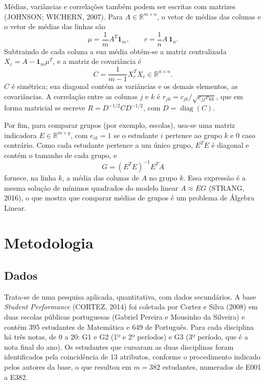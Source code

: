 \documentclass[12pt,a4paper]{article}
\newcommand{\R}{\mathbb{R}}
\begin{document}
Médias, variâncias e correlações também podem ser escritas com matrizes (JOHNSON; WICHERN, 2007). Para $A\in\R^{m\times n}$, o vetor de médias das colunas e o vetor de médias das linhas são
\begin{equation}
\mu=\frac{1}{m}A^T\mathbf{1}_m, \qquad r=\frac{1}{n}A\,\mathbf{1}_n .
\label{eq:medias}
\end{equation}
Subtraindo de cada coluna a sua média obtém-se a matriz centralizada $X_c=A-\mathbf{1}_m\mu^T$, e a matriz de covariância é
\begin{equation}
C=\frac{1}{m-1}X_c^T X_c \in \R^{n\times n}.
\label{eq:cov}
\end{equation}
$C$ é simétrica; sua diagonal contém as variâncias e os demais elementos, as covariâncias. A correlação entre as colunas $j$ e $k$ é $r_{jk}=c_{jk}/\sqrt{c_{jj}c_{kk}}$, que em forma matricial se escreve $R=D^{-1/2}CD^{-1/2}$, com $D=\operatorname{diag}(C)$.

Por fim, para comparar grupos (por exemplo, escolas), usa-se uma matriz indicadora $E\in\R^{m\times g}$, com $e_{ik}=1$ se o estudante $i$ pertence ao grupo $k$ e $0$ caso contrário. Como cada estudante pertence a um único grupo, $E^TE$ é diagonal e contém o tamanho de cada grupo, e
\begin{equation}
G=(E^TE)^{-1}E^TA
\label{eq:grupos}
\end{equation}
fornece, na linha $k$, a média das colunas de $A$ no grupo $k$. Essa expressão é a mesma solução de mínimos quadrados do modelo linear $A\approx EG$ (STRANG, 2016), o que mostra que comparar médias de grupos é um problema de Álgebra Linear.

\section{Metodologia}

\subsection{Dados}

Trata-se de uma pesquisa aplicada, quantitativa, com dados secundários. A base \textit{Student Performance} (CORTEZ, 2014) foi coletada por Cortez e Silva (2008) em duas escolas públicas portuguesas (Gabriel Pereira e Mousinho da Silveira) e contém 395 estudantes de Matemática e 649 de Português. Para cada disciplina há três notas, de 0 a 20: G1 e G2 (1º e 2º períodos) e G3 (3º período, que é a nota final do ano). Os estudantes que cursaram as duas disciplinas foram identificados pela coincidência de 13 atributos, conforme o procedimento indicado pelos autores da base, o que resultou em $m=382$ estudantes, numerados de E001 a E382.
\end{document}
